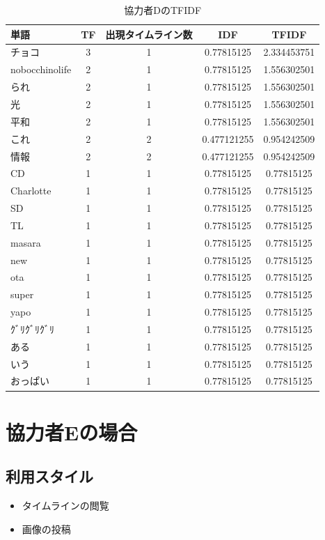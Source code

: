 \begin{table}[H]
	\centering
	\caption{協力者DのTFIDF}
	\begin{tabular}{l|c|c|c|c}
		単語 & TF & 出現タイムライン数 & IDF & TFIDF \\ \hline
		チョコ & 3 & 1 & 0.77815125 & 2.334453751 \\
		nobocchinolife & 2 & 1 & 0.77815125 & 1.556302501 \\
		られ & 2 & 1 & 0.77815125 & 1.556302501 \\
		光 & 2 & 1 & 0.77815125 & 1.556302501 \\
		平和 & 2 & 1 & 0.77815125 & 1.556302501 \\
		これ & 2 & 2 & 0.477121255 & 0.954242509 \\
		情報 & 2 & 2 & 0.477121255 & 0.954242509 \\
		CD & 1 & 1 & 0.77815125 & 0.77815125 \\
		Charlotte & 1 & 1 & 0.77815125 & 0.77815125 \\
		SD & 1 & 1 & 0.77815125 & 0.77815125 \\
		TL & 1 & 1 & 0.77815125 & 0.77815125 \\
		masara & 1 & 1 & 0.77815125 & 0.77815125 \\
		new & 1 & 1 & 0.77815125 & 0.77815125 \\
		ota & 1 & 1 & 0.77815125 & 0.77815125 \\
		super & 1 & 1 & 0.77815125 & 0.77815125 \\
		yapo & 1 & 1 & 0.77815125 & 0.77815125 \\
		ｸﾞﾘｸﾞﾘｸﾞﾘ & 1 & 1 & 0.77815125 & 0.77815125 \\
		ある & 1 & 1 & 0.77815125 & 0.77815125 \\
		いう & 1 & 1 & 0.77815125 & 0.77815125 \\
		おっぱい & 1 & 1 & 0.77815125 & 0.77815125
	\end{tabular}
\end{table}

\section{協力者Eの場合}

\subsection{利用スタイル}
\begin{itemize}
	\item タイムラインの閲覧
	\item 画像の投稿
\end{itemize}

